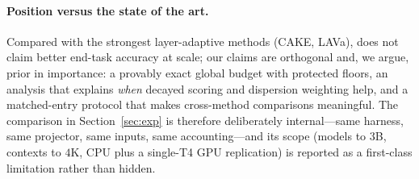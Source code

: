 \paragraph{Position versus the state of the art.}
Compared with the strongest layer-adaptive methods (CAKE, LAVa), \sage{}
does not claim better end-task accuracy at scale; our claims are
orthogonal and, we argue, prior in importance: a provably exact global
budget with protected floors, an analysis that explains \emph{when}
decayed scoring and dispersion weighting help, and a matched-entry
protocol that makes cross-method comparisons meaningful. The comparison in
Section~\ref{sec:exp} is therefore deliberately internal---same harness,
same projector, same inputs, same accounting---and its scope (models to
$3$B, contexts to $4$K, CPU plus a single-T4 GPU replication) is
reported as a first-class limitation rather than hidden.
